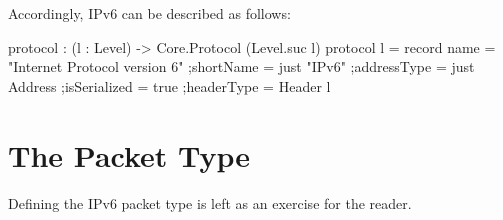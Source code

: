 \documentclass{report}
\begin{document}

Accordingly, IPv6 can be described as follows:

\begin{code}
  protocol : (l : Level) -> Core.Protocol (Level.suc l)
  protocol l = record
    {name = "Internet Protocol version 6"
    ;shortName = just "IPv6"
    ;addressType = just Address
    ;isSerialized = true
    ;headerType = Header l
    }
\end{code}

\section{The Packet Type}
Defining the IPv6 packet type is left as an exercise for the reader.
\end{document}
